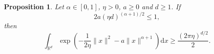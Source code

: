 \documentclass[11pt,letterpaper]{article}
\newtheorem{proposition}[thm]{Proposition}
\newcommand{\R}{\mathbb{R}}
\newcommand{\red}[1]{\textcolor{red}{#1}}
\newcommand{\rd}{\mathrm{d}}
\begin{document}

\begin{proposition}\label{prop:key}
Let $\alpha\in[0,1]$, $\eta>0$, $a\ge 0$ and $d\ge 1$. If 
    \begin{equation}\label{eq:aeta}
        2a(\eta d)^{(\alpha+1)/2} \le 1,
    \end{equation}
then
\begin{equation}\label{ineq:int}
    \int_{\R^d} \exp\left(-\frac{1}{2\eta}\|x\|^2 - a\|x\|^{\alpha+1}\right) \rd x
\ge \frac{(2\pi\eta)^{d/2}}2.
\end{equation}
\end{proposition}
\end{document}
